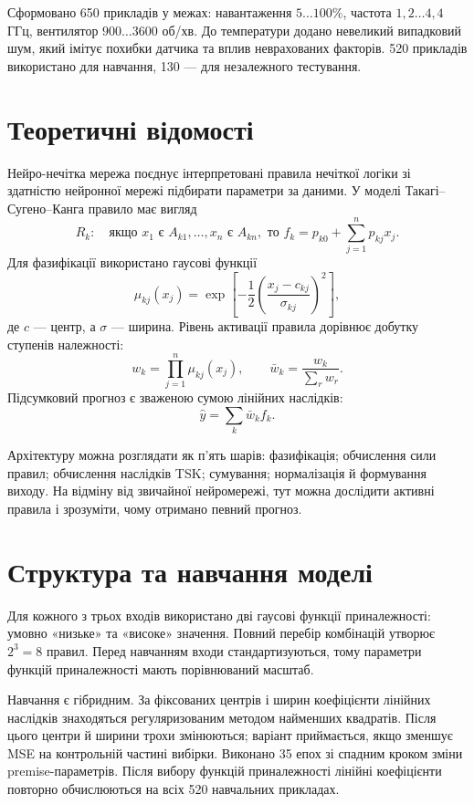 \documentclass[12pt,a4paper]{article}
\begin{document}
Сформовано 650 прикладів у межах: навантаження $5\ldots100\%$, частота $1{,}2\ldots4{,}4$ ГГц, вентилятор $900\ldots3600$ об/хв. До температури додано невеликий випадковий шум, який імітує похибки датчика та вплив неврахованих факторів. 520 прикладів використано для навчання, 130 --- для незалежного тестування.

\section{Теоретичні відомості}
Нейро-нечітка мережа поєднує інтерпретовані правила нечіткої логіки зі здатністю нейронної мережі підбирати параметри за даними. У моделі Такагі--Сугено--Канга правило має вигляд
\begin{equation}
R_k:\quad \text{якщо }x_1\text{ є }A_{k1},\ldots,x_n\text{ є }A_{kn},\text{ то }f_k=p_{k0}+\sum_{j=1}^{n}p_{kj}x_j.
\end{equation}
Для фазифікації використано гаусові функції
\begin{equation}\mu_{kj}(x_j)=\exp\!\left[-\frac12\left(\frac{x_j-c_{kj}}{\sigma_{kj}}\right)^2\right],\end{equation}
де $c$ --- центр, а $\sigma$ --- ширина. Рівень активації правила дорівнює добутку ступенів належності:
\begin{equation}w_k=\prod_{j=1}^{n}\mu_{kj}(x_j),\qquad \bar w_k=\frac{w_k}{\sum_r w_r}.
\end{equation}
Підсумковий прогноз є зваженою сумою лінійних наслідків:
\begin{equation}\hat y=\sum_k\bar w_k f_k.\end{equation}

Архітектуру можна розглядати як п'ять шарів: фазифікація; обчислення сили правил; обчислення наслідків TSK; сумування; нормалізація й формування виходу. На відміну від звичайної нейромережі, тут можна дослідити активні правила і зрозуміти, чому отримано певний прогноз.

\section{Структура та навчання моделі}
Для кожного з трьох входів використано дві гаусові функції приналежності: умовно «низьке» та «високе» значення. Повний перебір комбінацій утворює $2^3=8$ правил. Перед навчанням входи стандартизуються, тому параметри функцій приналежності мають порівнюваний масштаб.

Навчання є гібридним. За фіксованих центрів і ширин коефіцієнти лінійних наслідків знаходяться регуляризованим методом найменших квадратів. Після цього центри й ширини трохи змінюються; варіант приймається, якщо зменшує MSE на контрольній частині вибірки. Виконано 35 епох зі спадним кроком зміни premise-параметрів. Після вибору функцій приналежності лінійні коефіцієнти повторно обчислюються на всіх 520 навчальних прикладах.
\end{document}
